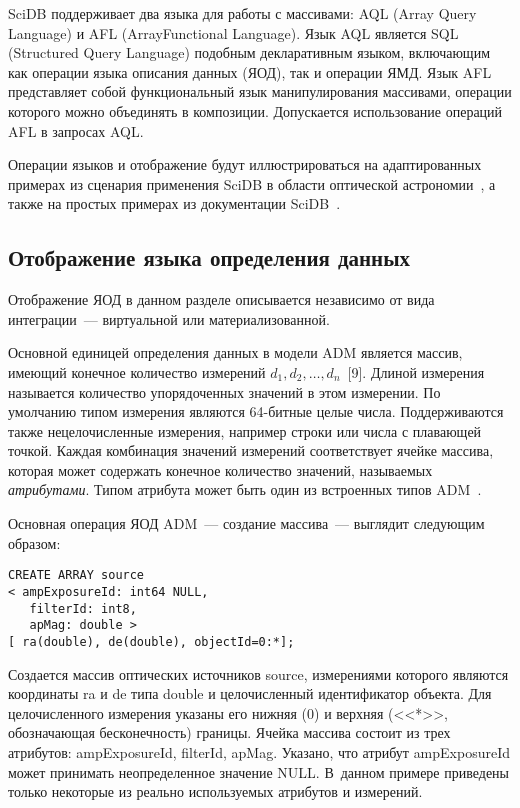 \begin{multicols}{2}
\vspace*{2pt}

        SciDB поддерживает два языка для работы с массивами: AQL (Array 
Query Language) и AFL (Array\linebreak Functional Language). Язык AQL является 
        SQL (Structured Query Language)
        по\-доб\-ным декларативным языком, включающим как операции 
языка описания данных (ЯОД), так и операции ЯМД. Язык AFL представляет собой функциональный язык 
манипулирования массивами, операции которого можно объединять в 
композиции. Допускается использование операций AFL в запросах AQL.
        
        Операции языков и отображение будут иллюстрироваться на 
адаптированных примерах из сценария применения SciDB в области 
оптической астрономии~\cite{17-stu}, а также на простых примерах из 
документации SciDB~\cite{9-stu}.

\subsection{Отображение языка определения данных}

        Отображение ЯОД в данном разделе описывается независимо от вида 
интеграции~--- виртуальной или материализованной.
        
        Основной единицей определения данных в модели ADM является 
массив, имеющий конечное количество {измерений} $d_1, d_2, \ldots , 
d_n$~[9]. Длиной измерения называется количество упорядоченных значений в 
этом измерении. По умолчанию типом измерения являются 64-бит\-ные целые 
числа. Поддерживаются также нецелочисленные измерения, например строки 
или числа с плавающей точкой. Каждая комбинация значений измерений 
соответствует ячейке массива, которая может содержать конечное количество 
значений, называемых \textit{атрибутами}. Типом атрибута может быть один 
из встроенных типов ADM~\cite{9-stu}.
        
        Основная операция ЯОД ADM~--- создание массива~--- выглядит 
следующим образом:
        \begin{verbatim}
CREATE ARRAY source
< ampExposureId: int64 NULL, 
   filterId: int8,
   apMag: double >
[ ra(double), de(double), objectId=0:*];
\end{verbatim}

        Создается массив оптических источников {\sf source}, измерениями 
которого являются координаты {\sf ra} и {\sf de} типа {\sf double} и целочисленный 
идентификатор объекта. Для целочисленного измерения указаны его нижняя (0) 
и верхняя (<<*>>, обозна\-ча\-ющая бесконечность) границы. Ячейка массива 
состоит из трех атрибутов: {\sf ampExposureId}, {\sf filterId}, 
{\sf apMag}. Указано, что 
атрибут {\sf ampExposureId} может принимать неопределенное значение {\sf NULL}. 
В~данном примере приведены только некоторые из реально используемых 
атрибутов и измерений.
        

\end{multicols}
